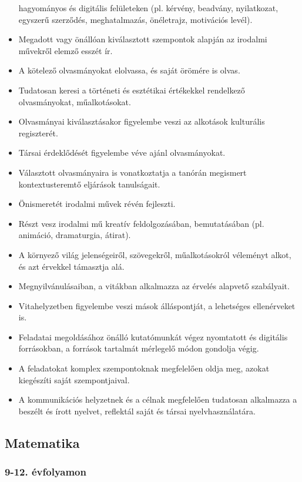 \begin{itemize}
  hagyományos és digitális felületeken (pl. kérvény, beadvány,
  nyilatkozat, egyszerű szerződés, meghatalmazás, önéletrajz, motivációs
  levél).
\item
  Megadott vagy önállóan kiválasztott szempontok alapján az irodalmi
  művekről elemző esszét ír.
\item
  A kötelező olvasmányokat elolvassa, és saját örömére is olvas.
\item
  Tudatosan keresi a történeti és esztétikai értékekkel rendelkező
  olvasmányokat, műalkotásokat.
\item
  Olvasmányai kiválasztásakor figyelembe veszi az alkotások kulturális
  regiszterét.
\item
  Társai érdeklődését figyelembe véve ajánl olvasmányokat.
\item
  Választott olvasmányaira is vonatkoztatja a tanórán megismert
  kontextusteremtő eljárások tanulságait.
\item
  Önismeretét irodalmi művek révén fejleszti.
\item
  Részt vesz irodalmi mű kreatív feldolgozásában, bemutatásában (pl.
  animáció, dramaturgia, átirat).
\item
  A környező világ jelenségeiről, szövegekről, műalkotásokról véleményt
  alkot, és azt érvekkel támasztja alá.
\item
  Megnyilvánulásaiban, a vitákban alkalmazza az érvelés alapvető
  szabályait.
\item
  Vitahelyzetben figyelembe veszi mások álláspontját, a lehetséges
  ellenérveket is.
\item
  Feladatai megoldásához önálló kutatómunkát végez nyomtatott és
  digitális forrásokban, a források tartalmát mérlegelő módon gondolja
  végig.
\item
  A feladatokat komplex szempontoknak megfelelően oldja meg, azokat
  kiegészíti saját szempontjaival.
\item
  A kommunikációs helyzetnek és a célnak megfelelően tudatosan
  alkalmazza a beszélt és írott nyelvet, reflektál saját és társai
  nyelvhasználatára.
\end{itemize}

\hypertarget{matematika}{%
\subsection{Matematika}\label{matematika}}

\hypertarget{evfolyamon-5}{%
\subsubsection{9-12. évfolyamon}\label{evfolyamon-5}}

